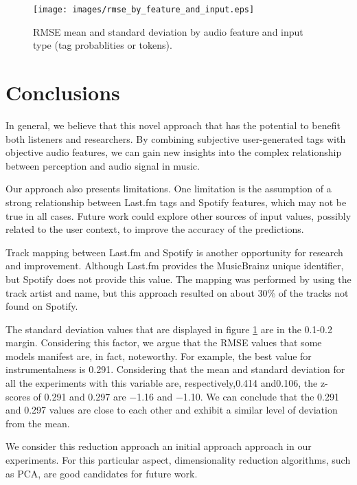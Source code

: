 \documentclass[sn-mathphys]{sn-jnl}%
\theoremstyle{thmstyleone}%
\theoremstyle{thmstyletwo}%
\theoremstyle{thmstylethree}%
\begin{document}
\begin{figure}[h!]
      \centering
      \texttt{[image: images/rmse\_by\_feature\_and\_input.eps]}
      \caption{RMSE mean and standard deviation by audio feature and input type (tag probablities or tokens).}
      \label{fig:rmse_by_feature_and_input}
\end{figure}

\section{Conclusions}

In general, we believe that this novel approach that has the potential to benefit both listeners and researchers.
By combining subjective user-generated tags with objective audio features,
we can gain new insights into the complex relationship between perception and audio signal in music.

Our approach also presents limitations.
One limitation is the assumption of a strong relationship between Last.fm tags and Spotify features, which may not be true in all cases.
Future work could explore other sources of input values, possibly related to the user context, to improve the accuracy of the predictions.

Track mapping between Last.fm and Spotify is another opportunity for research and improvement.
Although Last.fm provides the MusicBrainz unique identifier, but Spotify does not provide this value.
The mapping was performed by using the track artist and name, but this approach resulted on about 30\% of the tracks not found on Spotify.

The standard deviation values that are displayed in figure \ref{fig:rmse_by_feature_and_input} are in the 0.1-0.2 margin.
Considering this factor, we argue that the RMSE values that some models manifest are, in fact, noteworthy.
For example, the best value for instrumentalness is \num{0.291}.
Considering that the mean and standard deviation for all the experiments with this variable are, respectively,\num{0.414} and\num{0.106}, the z-scores
of \num{0.291} and \num{0.297} are \num{-1.16} and \num{-1.10}.
We can conclude that the \num{0.291} and \num{0.297} values are close to each other and exhibit a similar level of deviation from the mean.

We consider this reduction approach an initial approach approach in our experiments.
For this particular aspect, dimensionality reduction algorithms, such as PCA, are good candidates for future work.
\end{document}
